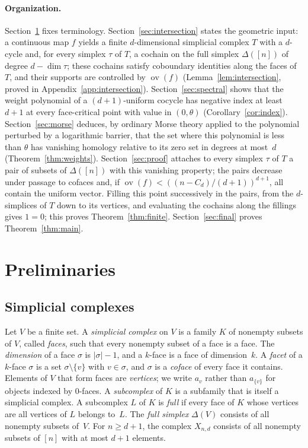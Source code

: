 \documentclass[11pt]{article}
\theoremstyle{definition}
\numberwithin{equation}{section}
\DeclareMathOperator{\ov}{ov}
\begin{document}
\paragraph{Organization.} Section~\ref{sec:prelim} fixes terminology. Section~\ref{sec:intersection} states the geometric input: a continuous map $f$ yields a finite $d$-dimensional simplicial complex $T$ with a $d$-cycle and, for every simplex $\tau$ of $T$, a cochain on the full simplex $\Delta([n])$ of degree $d-\dim\tau$; these cochains satisfy coboundary identities along the faces of $T$, and their supports are controlled by $\ov(f)$ (Lemma~\ref{lem:intersection}, proved in Appendix~\ref{app:intersection}). Section~\ref{sec:spectral} shows that the weight polynomial of a $(d+1)$-uniform cocycle has negative index at least $d+1$ at every face-critical point with value in $(0,\theta)$ (Corollary~\ref{cor:index}). Section~\ref{sec:morse} deduces, by ordinary Morse theory applied to the polynomial perturbed by a logarithmic barrier, that the set where this polynomial is less than $\theta$ has vanishing homology relative to its zero set in degrees at most~$d$ (Theorem~\ref{thm:weights}). Section~\ref{sec:proof} attaches to every simplex $\tau$ of $T$ a pair of subsets of $\Delta([n])$ with this vanishing property; the pairs decrease under passage to cofaces and, if $\ov(f)<((n-C_d)/(d+1))^{d+1}$, all contain the uniform vector. Filling this point successively in the pairs, from the $d$-simplices of $T$ down to its vertices, and evaluating the cochains along the fillings gives $1=0$; this proves Theorem~\ref{thm:finite}. Section~\ref{sec:final} proves Theorem~\ref{thm:main}.

\section{Preliminaries}\label{sec:prelim}

\subsection{Simplicial complexes}\label{sec:complexes}

Let $V$ be a finite set. A \emph{simplicial complex} on $V$ is a family $K$ of nonempty subsets of $V$, called \emph{faces}, such that every nonempty subset of a face is a face. The \emph{dimension} of a face $\sigma$ is $|\sigma|-1$, and a $k$-face is a face of dimension~$k$. A \emph{facet} of a $k$-face $\sigma$ is a set $\sigma\setminus\{v\}$ with $v\in\sigma$, and $\sigma$ is a \emph{coface} of every face it contains. Elements of $V$ that form faces are \emph{vertices}; we write $a_v$ rather than $a_{\{v\}}$ for objects indexed by $0$-faces. A \emph{subcomplex} of $K$ is a subfamily that is itself a simplicial complex. A subcomplex $L$ of $K$ is \emph{full} if every face of $K$ whose vertices are all vertices of $L$ belongs to~$L$. The \emph{full simplex} $\Delta(V)$ consists of all nonempty subsets of~$V$. For $n\ge d+1$, the complex $X_{n,d}$ consists of all nonempty subsets of $[n]$ with at most $d+1$ elements.
\end{document}
